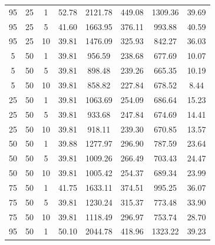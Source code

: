 \begin{table}[H]
\begin{tabular}{ccc|c|c|c|c|c}
95 & 25 & 1 & \cellcolor{gray!1}52.78 & \cellcolor{gray!1}2121.78 & \cellcolor{gray!1}449.08 & \cellcolor{gray!1}1309.36 & 39.69\\
95 & 25 & 5 & \cellcolor{gray!32}41.60 & \cellcolor{gray!1}1663.95 & \cellcolor{gray!1}376.11 & \cellcolor{gray!1}993.88 & 40.59\\
95 & 25 & 10 & \cellcolor{gray!50}39.81 & \cellcolor{gray!1}1476.09 & \cellcolor{gray!1}325.93 & \cellcolor{gray!1}842.27 & 36.03\\
5 & 50 & 1 & \cellcolor{gray!50}39.81 & \cellcolor{gray!12}956.59 & \cellcolor{gray!1}238.68 & \cellcolor{gray!45}677.69 & 10.07\\
5 & 50 & 5 & \cellcolor{gray!50}39.81 & \cellcolor{gray!22}898.48 & \cellcolor{gray!1}239.26 & \cellcolor{gray!49}665.35 & 10.19\\
5 & 50 & 10 & \cellcolor{gray!50}39.81 & \cellcolor{gray!28}858.82 & \cellcolor{gray!3}227.84 & \cellcolor{gray!45}678.52 & 8.44\\
25 & 50 & 1 & \cellcolor{gray!50}39.81 & \cellcolor{gray!1}1063.69 & \cellcolor{gray!1}254.09 & \cellcolor{gray!42}686.64 & 15.23\\
25 & 50 & 5 & \cellcolor{gray!50}39.81 & \cellcolor{gray!16}933.68 & \cellcolor{gray!1}247.84 & \cellcolor{gray!46}674.69 & 14.41\\
25 & 50 & 10 & \cellcolor{gray!50}39.81 & \cellcolor{gray!18}918.11 & \cellcolor{gray!1}239.30 & \cellcolor{gray!47}670.85 & 13.57\\
50 & 50 & 1 & \cellcolor{gray!50}39.88 & \cellcolor{gray!1}1277.97 & \cellcolor{gray!1}296.90 & \cellcolor{gray!11}787.59 & 23.64\\
50 & 50 & 5 & \cellcolor{gray!50}39.81 & \cellcolor{gray!3}1009.26 & \cellcolor{gray!1}266.49 & \cellcolor{gray!37}703.43 & 24.47\\
50 & 50 & 10 & \cellcolor{gray!50}39.81 & \cellcolor{gray!4}1005.42 & \cellcolor{gray!1}254.37 & \cellcolor{gray!41}689.34 & 23.99\\
75 & 50 & 1 & \cellcolor{gray!31}41.75 & \cellcolor{gray!1}1633.11 & \cellcolor{gray!1}374.51 & \cellcolor{gray!1}995.25 & 36.07\\
75 & 50 & 5 & \cellcolor{gray!50}39.81 & \cellcolor{gray!1}1230.24 & \cellcolor{gray!1}315.37 & \cellcolor{gray!16}773.48 & 33.90\\
75 & 50 & 10 & \cellcolor{gray!50}39.81 & \cellcolor{gray!1}1118.49 & \cellcolor{gray!1}296.97 & \cellcolor{gray!22}753.74 & 28.70\\
95 & 50 & 1 & \cellcolor{gray!1}50.10 & \cellcolor{gray!1}2044.78 & \cellcolor{gray!1}418.96 & \cellcolor{gray!1}1323.22 & 39.23\\

\end{tabular}
\end{table}
